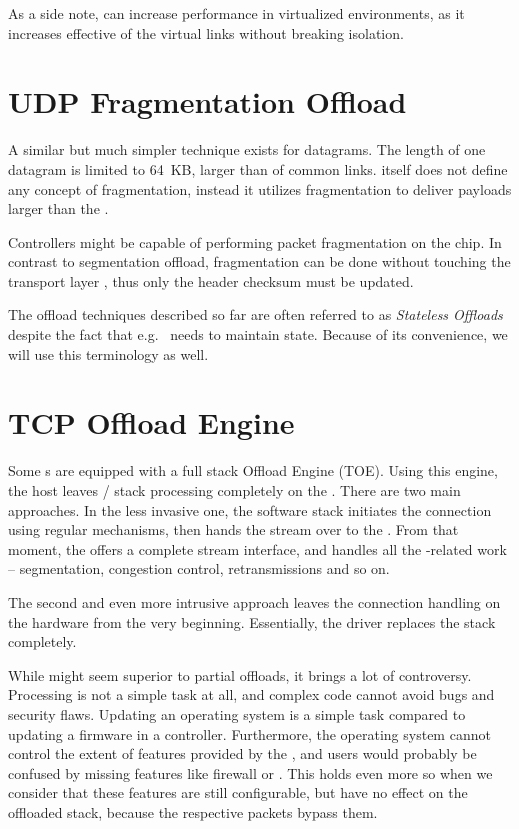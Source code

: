 As a side note,  can increase performance in virtualized environments,
as it increases effective  of the virtual links without
breaking isolation.

\section{UDP Fragmentation Offload}

A similar but much simpler technique exists for  datagrams. The length of one
 datagram is limited to 64~KB, larger than  of common links.
 itself does not define any concept of fragmentation, instead it
utilizes  fragmentation to deliver payloads larger than the .

Controllers might be capable of performing  packet fragmentation on the
chip. In contrast to  segmentation offload,  fragmentation
can be done without touching the transport layer , thus only the  header
checksum must be updated.

The offload techniques described so far are often referred to as \emph{Stateless
Offloads} despite the fact that e.g.\  needs to maintain state. Because
of its convenience, we will use this terminology as well.

\section{TCP Offload Engine}

Some s are equipped with a full  stack Offload Engine (TOE). Using this
engine, the host leaves / stack processing completely on the .
There are two main approaches. In the less invasive one, the software stack
initiates the connection using regular mechanisms, then hands the stream over
to the . From that moment, the  offers a complete stream
interface, and handles all the -related work -- segmentation, congestion
control, retransmissions and so on.

The second and even more intrusive approach leaves the  connection
handling on the hardware from the very beginning. Essentially, the  driver
replaces the  stack completely.

While  might seem superior to partial offloads, it brings a lot of
controversy. Processing  is not a simple task at all, and complex code
cannot avoid bugs and security flaws. Updating an operating system is a simple task
compared to updating a firmware in a controller. Furthermore, the operating
system cannot control the extent of features provided by the , and users
would probably be confused by missing features like firewall or . This holds even more so
when we consider that these features are still configurable, but have no effect
on the offloaded  stack, because the respective packets bypass them.

